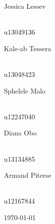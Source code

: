 \documentclass[a4paper,12pt]{report}
\begin{document}
\begin{titlepage}
\begin{center}
\begin{minipage}{0.4\textwidth}
\begin{flushleft}
Jessica {Lessev}
\end{flushleft}
\end{minipage}
\begin{minipage}{0.4\textwidth}
\begin{flushright} \large
\emph{} \\
u13049136
\end{flushright}
\end{minipage}
\begin{minipage}{0.4\textwidth}
\begin{flushleft} \large
Kale-ab {Tessera}
\end{flushleft}
\end{minipage}
\begin{minipage}{0.4\textwidth}
\begin{flushright} \large
\emph{} \\
u13048423
\end{flushright}
\end{minipage}
\begin{minipage}{0.4\textwidth}
\begin{flushleft} \large
Sphelele {Malo}
\end{flushleft}
\end{minipage}
\begin{minipage}{0.4\textwidth}
\begin{flushright} \large
\emph{} \\
u12247040
\end{flushright}
\end{minipage}
\begin{minipage}{0.4\textwidth}
\begin{flushleft} \large
Diana {Obo}
\end{flushleft}
\end{minipage}
\begin{minipage}{0.4\textwidth}
\begin{flushright} \large
\emph{} \\
u13134885
\end{flushright}
\end{minipage}
\begin{minipage}{0.4\textwidth}
\begin{flushleft} \large
Armand {Piterse}
\end{flushleft}
\end{minipage}
\begin{minipage}{0.4\textwidth}
\begin{flushright} \large
\emph{} \\
u12167844
\end{flushright}
\end{minipage}
\vfill
{\large \today}
\end{center}
\end{titlepage}
\footnotesize
%
\normalsize
\end{document}
